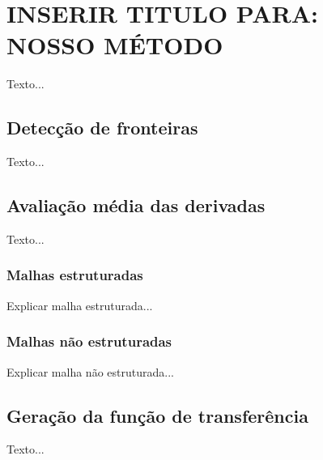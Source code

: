 
\chapter{INSERIR TITULO PARA: NOSSO MÉTODO}
\label{my}

	Texto...

\section{Detecção de fronteiras}
\label{my.bound}
	Texto...

\section{Avaliação média das derivadas}
\label{my.deriv}
	Texto...
    
\subsection{Malhas estruturadas}
\label{my.struct}
	Explicar malha estruturada...

\subsection{Malhas não estruturadas}
\label{my.nonstruct}
	Explicar malha não estruturada...

\section{Geração da função de transferência}
\label{my.tf}
	Texto...